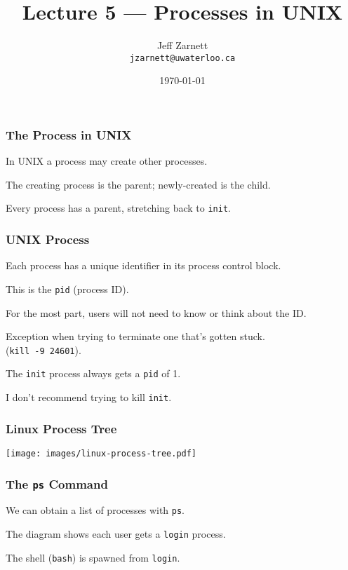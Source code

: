 

\title{Lecture 5 --- Processes in UNIX}

\author{Jeff Zarnett \\ \small \texttt{jzarnett@uwaterloo.ca}}
\date{\today}




\begin{frame}
	\titlepage

\end{frame}

\begin{frame}
	\frametitle{The Process in UNIX}

	In UNIX a process may create other processes.

	The creating process is the parent; newly-created is the child.

	Every process has a parent, stretching back to \texttt{init}.

\end{frame}


\begin{frame}
	\frametitle{UNIX Process}
	Each process has a unique identifier in its process control block.

	This is the \texttt{pid} (process ID).

	For the most part, users will not need to know or think about the ID.

	Exception when trying to terminate one that's gotten stuck.\\
	\quad (\texttt{kill -9 24601}).

	The \texttt{init} process always gets a \texttt{pid} of 1.

	I don't recommend trying to kill \texttt{init}.

\end{frame}

\begin{frame}
	\frametitle{Linux Process Tree}

	\begin{center}
		\texttt{[image: images/linux-process-tree.pdf]}
	\end{center}

\end{frame}

\begin{frame}
	\frametitle{The \texttt{ps} Command}

	We can obtain a list of processes with \texttt{ps}.

	The diagram shows each user gets a \texttt{login} process.

	The shell (\texttt{bash}) is spawned from \texttt{login}.

\end{frame}

